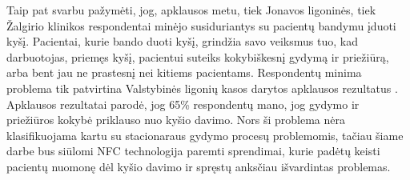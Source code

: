 Taip pat svarbu pažymėti, jog, apklausos metu, tiek Jonavos ligoninės, tiek Žalgirio klinikos respondentai minėjo susiduriantys su pacientų bandymu įduoti kyšį. Pacientai, kurie bando duoti kyšį, grindžia savo veiksmus tuo, kad darbuotojas, priemęs kyšį, pacientui suteiks kokybiškesnį gydymą ir priežiūrą, arba bent jau ne prastesnį nei kitiems pacientams. Respondentų minima problema tik patvirtina Valstybinės ligonių kasos darytos apklausos rezultatus \cite{Kasa2016}. Apklausos rezultatai parodė, jog 65\% respondentų mano, jog gydymo ir priežiūros kokybė priklauso nuo kyšio davimo. Nors ši problema nėra klasifikuojama kartu su stacionaraus gydymo procesų problemomis, tačiau šiame darbe bus siūlomi NFC technologija paremti sprendimai, kurie padėtų keisti pacientų nuomonę dėl kyšio davimo ir spręstų anksčiau išvardintas problemas.




